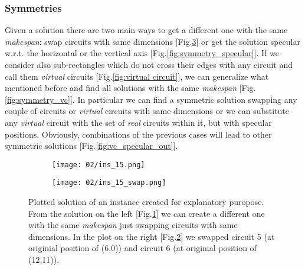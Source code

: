     \subsubsection{Symmetries} \label{sec:symmetries}

        Given a solution there are two main ways to get a different one with the same \textit{makespan}:
        swap circuits with same dimensions [Fig.\ref{fig:symmetry_swap}] or get the solution specular w.r.t. the horizontal 
        or the vertical axis [Fig.\ref{fig:symmetry_specular}].
        If we consider also sub-rectangles which do not cross their edges with any circuit and call them 
        \textit{virtual} circuits [Fig.\ref{fig:virtual circuit}], we can generalize what mentioned before and find all solutions with 
        the same \textit{makespan} [Fig.\ref{fig:symmetry_vc}].
        In particular we can find a symmetric solution swapping any couple of circuits or \textit{virtual} circuits 
        with same dimensions or we can substitute any \textit{virtual} circuit with the set of \textit{real} circuits within it, 
        but with specular positions. Obviously, combinations of the previous cases will lead to other symmetric 
        solutions [Fig.\ref{fig:vc_specular_out}].

        \begin{figure}[H]
            \centering
            \begin{subfigure}[b]{0.45\textwidth}
                \centering 
                \texttt{[image: 02/ins\_15.png]}
                \caption{}
                \label{fig:ins_15_mod}
            \end{subfigure}
            \hfill
            \begin{subfigure}[b]{0.45\textwidth}
                \centering
                \texttt{[image: 02/ins\_15\_swap.png]}
                \caption{}
                \label{fig:ins_15_swap}
            \end{subfigure}
            \hfill
            \caption{
                Plotted solution of an instance created for explanatory puropose.
                From the solution on the left [Fig.\ref{fig:ins_15_mod}] we can create a different one
                with the same \textit{makespan} just swapping circuits with same dimensions. In
                the plot on the right [Fig.\ref{fig:ins_15_swap}] we swapped circuit 5 (at originial
                position of (6,0)) and circuit 6 (at originial position of (12,11)).
            }
            \label{fig:symmetry_swap}
        \end{figure}
       
